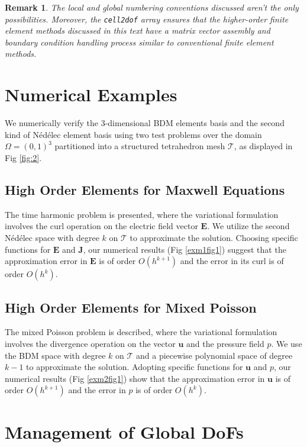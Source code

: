 \documentclass[12pt, a4paper]{article}
\newtheorem{remark}[theorem]{Remark}
\begin{document}
\begin{remark}
  The local and global numbering conventions discussed aren't the only
  possibilities. Moreover, the \lstinline{cell2dof} array ensures that the
  higher-order finite element methods discussed in this text have a matrix
  vector assembly and boundary condition handling process similar to
  conventional finite element methods.
\end{remark}

\section{Numerical Examples}
We numerically verify the 3-dimensional BDM elements basis and the second kind
of N\'ed\'elec element basis using two test problems over the domain $\Omega =
(0, 1)^3$ partitioned into a structured tetrahedron mesh $\mathcal T$, as
displayed in Fig \ref{fig:2}.

\subsection{High Order Elements for Maxwell Equations}
The time harmonic problem is presented, where the variational formulation
involves the curl operation on the electric field vector $\boldsymbol E$. We
utilize the second N\'ed\'elec space with degree $k$ on $\mathcal T$ to
approximate the solution. Choosing specific functions for $\boldsymbol E$ and
$\boldsymbol J$, our numerical results (Fig \ref{exm1fig1}) suggest that the
approximation error in $\boldsymbol E$ is of order $O(h^{k+1})$ and the error in
its curl is of order $O(h^k)$.

\subsection{High Order Elements for Mixed Poisson}
The mixed Poisson problem is described, where the variational formulation
involves the divergence operation on the vector $\boldsymbol u$ and the pressure
field $p$. We use the BDM space with degree $k$ on $\mathcal T$ and a piecewise
polynomial space of degree $k-1$ to approximate the solution. Adopting specific
functions for $\boldsymbol u$ and $p$, our numerical results (Fig
\ref{exm2fig1}) show that the approximation error in $\boldsymbol u$ is of order
$O(h^{k+1})$ and the error in $p$ is of order $O(h^{k})$.



\section{Management of Global DoFs}\label{sec:implementation}
\end{document}
